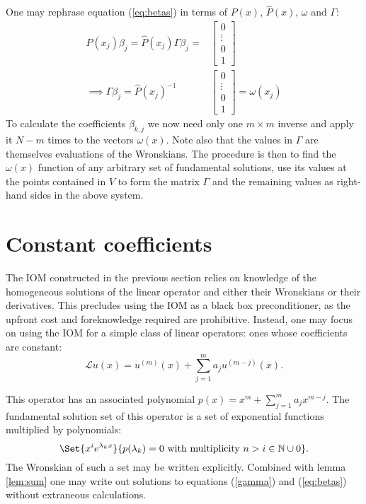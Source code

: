 \documentclass{article}
\begin{document}
One may rephrase equation (\ref{eq:betas}) in terms of $P(x)$, $\hat{P}(x)$, $\omega$ and $\Gamma$:
\begin{align*}
P(x_j) \beta_j = \hat{P}(x_j) \Gamma \beta_j = & \begin{bmatrix} 0 \\ \vdots \\ 0 \\ 1 \end{bmatrix} \\
\implies \Gamma \beta_j = \hat{P}(x_j)^{-1} & \begin{bmatrix} 0 \\ \vdots \\ 0 \\ 1 \end{bmatrix} = \omega(x_j)
\end{align*}
To calculate the coefficients $\beta_{k,j}$ we now need only one $m \times m$ inverse and apply it $N-m$ times to the vectors $\omega(x)$.
Note also that the values in $\Gamma$ are themselves evaluations of the Wronskians.
The procedure is then to find the $\omega(x)$ function of any arbitrary set of fundamental solutions, use its values at the points contained in $V$ to form the matrix $\Gamma$ and the remaining values as right-hand sides in the above system.

\section{Constant coefficients}

The IOM constructed in the previous section relies on knowledge of the homogeneous solutions of the linear operator and either their Wronskians or their derivatives.
This precludes using the IOM as a black box preconditioner, as the upfront cost and foreknowledge required are prohibitive.
Instead, one may focus on using the IOM for a simple class of linear operators: ones whose coefficients are constant:
\begin{equation*}
\mathcal{L}u(x) = u^{(m)}(x) + \sum_{j=1}^{m} a_j u^{(m-j)}(x) .
\end{equation*}

This operator has an associated polynomial $p(x) = x^m + \sum_{j=1}^{m} a_j x^{m-j}$.
The fundamental solution set of this operator is a set of exponential functions multiplied by polynomials:
\begin{equation*}
\Set{x^{i} e^{\lambda_k x}}{p(\lambda_k) = 0 \ \text{with multiplicity } n>i \in \mathbb{N} \cup 0} .
\end{equation*}
The Wronskian of such a set may be written explicitly.
Combined with lemma \ref{lem:sum} one may write out solutions to equations (\ref{gamma}) and (\ref{eq:betas}) without extraneous calculations.
\end{document}

